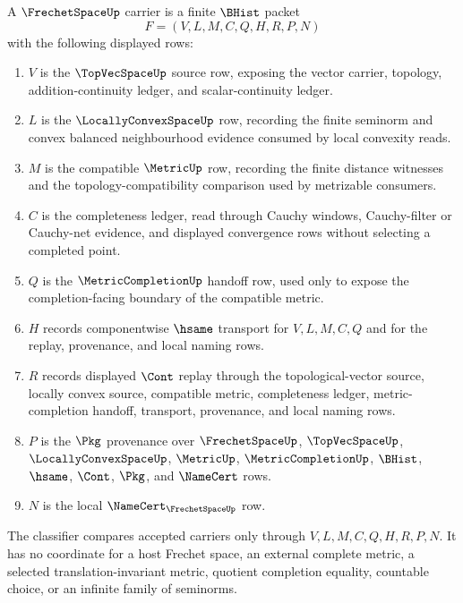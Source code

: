 \begin{definition}
\label{def:frechet-space-carrier}
A $\FrechetSpaceUp$ carrier is a finite $\BHist$ packet
$$
F=(V,L,M,C,Q,H,R,P,N)
$$
with the following displayed rows:
\begin{enumerate}
\item $V$ is the $\TopVecSpaceUp$ source row, exposing the vector carrier, topology, addition-continuity ledger, and scalar-continuity ledger.
\item $L$ is the $\LocallyConvexSpaceUp$ row, recording the finite seminorm and convex balanced neighbourhood evidence consumed by local convexity reads.
\item $M$ is the compatible $\MetricUp$ row, recording the finite distance witnesses and the topology-compatibility comparison used by metrizable consumers.
\item $C$ is the completeness ledger, read through Cauchy windows, Cauchy-filter or Cauchy-net evidence, and displayed convergence rows without selecting a completed point.
\item $Q$ is the $\MetricCompletionUp$ handoff row, used only to expose the completion-facing boundary of the compatible metric.
\item $H$ records componentwise $\hsame$ transport for $V,L,M,C,Q$ and for the replay, provenance, and local naming rows.
\item $R$ records displayed $\Cont$ replay through the topological-vector source, locally convex source, compatible metric, completeness ledger, metric-completion handoff, transport, provenance, and local naming rows.
\item $P$ is the $\Pkg$ provenance over $\FrechetSpaceUp$, $\TopVecSpaceUp$, $\LocallyConvexSpaceUp$, $\MetricUp$, $\MetricCompletionUp$, $\BHist$, $\hsame$, $\Cont$, $\Pkg$, and $\NameCert$ rows.
\item $N$ is the local $\NameCert_{\FrechetSpaceUp}$ row.
\end{enumerate}
The classifier compares accepted carriers only through $V,L,M,C,Q,H,R,P,N$. It has no coordinate for a host Frechet space, an external complete metric, a selected translation-invariant metric, quotient completion equality, countable choice, or an infinite family of seminorms.
\end{definition}

